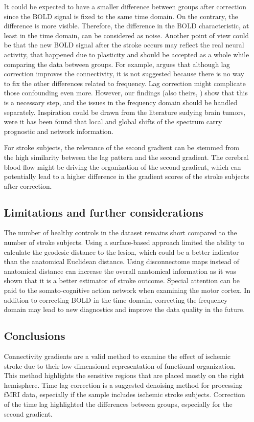 \documentclass[fleqn,10pt]{wlscirep}
\begin{document}
It could be expected to have a smaller difference between groups after correction since the BOLD signal is fixed to the same time domain. On the contrary, the difference is more visible. Therefore, the difference in the BOLD characteristic, at least in the time domain, can be considered as noise. Another point of view could be that the new BOLD signal after the stroke occurs may reflect the real neural activity, that happened due to plasticity and should be accepted as a whole while comparing the data between groups. For example, \citet{siegel2016disruptions} argues that although lag correction improves the connectivity, it is not suggested because there is no way to fix the other differences related to frequency. Lag correction might complicate those confounding even more. However, our findings (also theirs, \cite{siegel2016effects}) show that this is a necessary step, and the issues in the frequency domain should be handled separately. Inspiration could be drawn from the literature sudying brain tumors, were it has been found that local and global shifts of the spectrum carry prognostic \citet{park2023glioblastoma} and network \citet{falco2024functional} information.   

For stroke subjects, the relevance of the second gradient can be stemmed from the high similarity between the lag pattern and the second gradient. The cerebral blood flow might be driving the organization of the second gradient, which can potentially lead to a higher difference in the gradient scores of the stroke subjects after correction. 

\subsection*{Limitations and further considerations}
The number of healthy controls in the dataset remains short compared to the number of stroke subjects. Using a surface-based approach limited the ability to calculate the geodesic distance to the lesion, which could be a better indicator than the anatomical Euclidean distance. Using disconnectome maps instead of anatomical distance can increase the overall anatomical information as it was shown that it is a better estimator of stroke outcome. Special attention can be paid to the somato-cognitive action network when examining the motor cortex. In addition to correcting BOLD in the time domain, correcting the frequency domain may lead to new diagnostics and improve the data quality in the future. 

\subsection*{Conclusions}
Connectivity gradients are a valid method to examine the effect of ischemic stroke due to their low-dimensional representation of functional organization. This method highlights the sensitive regions that are placed mostly on the right hemisphere. Time lag correction is a suggested denoising method for processing fMRI data, especially if the sample includes ischemic stroke subjects. Correction of the time lag highlighted the differences between groups, especially for the second gradient. 
\end{document}

